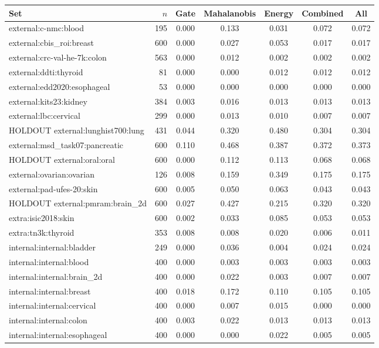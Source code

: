 \begin{tabular}{@{}lrccccc@{}}
\toprule
Set & $n$ & Gate & Mahalanobis & Energy & Combined & All \\
\midrule
external:c-nmc:blood & 195 & 0.000 & 0.133 & 0.031 & 0.072 & 0.072 \\
external:cbis\_roi:breast & 600 & 0.000 & 0.027 & 0.053 & 0.017 & 0.017 \\
external:crc-val-he-7k:colon & 563 & 0.000 & 0.012 & 0.002 & 0.002 & 0.002 \\
external:ddti:thyroid & 81 & 0.000 & 0.000 & 0.012 & 0.012 & 0.012 \\
external:edd2020:esophageal & 53 & 0.000 & 0.000 & 0.000 & 0.000 & 0.000 \\
external:kits23:kidney & 384 & 0.003 & 0.016 & 0.013 & 0.013 & 0.013 \\
external:lbc:cervical & 299 & 0.000 & 0.013 & 0.010 & 0.007 & 0.007 \\
HOLDOUT external:lunghist700:lung & 431 & 0.044 & 0.320 & 0.480 & 0.304 & 0.304 \\
external:msd\_task07:pancreatic & 600 & 0.110 & 0.468 & 0.387 & 0.372 & 0.373 \\
HOLDOUT external:oral:oral & 600 & 0.000 & 0.112 & 0.113 & 0.068 & 0.068 \\
external:ovarian:ovarian & 126 & 0.008 & 0.159 & 0.349 & 0.175 & 0.175 \\
external:pad-ufes-20:skin & 600 & 0.005 & 0.050 & 0.063 & 0.043 & 0.043 \\
HOLDOUT external:pmram:brain\_2d & 600 & 0.027 & 0.427 & 0.215 & 0.320 & 0.320 \\
extra:isic2018:skin & 600 & 0.002 & 0.033 & 0.085 & 0.053 & 0.053 \\
extra:tn3k:thyroid & 353 & 0.008 & 0.008 & 0.020 & 0.006 & 0.011 \\
internal:internal:bladder & 249 & 0.000 & 0.036 & 0.004 & 0.024 & 0.024 \\
internal:internal:blood & 400 & 0.000 & 0.003 & 0.003 & 0.003 & 0.003 \\
internal:internal:brain\_2d & 400 & 0.000 & 0.022 & 0.003 & 0.007 & 0.007 \\
internal:internal:breast & 400 & 0.018 & 0.172 & 0.110 & 0.105 & 0.105 \\
internal:internal:cervical & 400 & 0.000 & 0.007 & 0.015 & 0.000 & 0.000 \\
internal:internal:colon & 400 & 0.003 & 0.022 & 0.013 & 0.013 & 0.013 \\
internal:internal:esophageal & 400 & 0.000 & 0.000 & 0.022 & 0.005 & 0.005 \\

\end{tabular}
